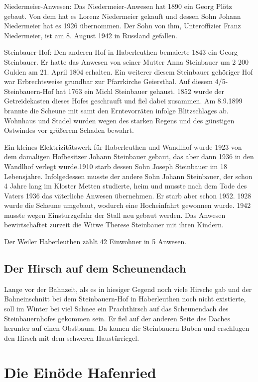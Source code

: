 \documentclass[12pt,a4pager]{book}
\begin{document}
Niedermeier-Anwesen: Das Niedermeier-Anwesen hat 1890 ein Georg Plötz gebaut.
Von dem hat es Lorenz Niedermeier gekauft und dessen Sohn Johann Niedermeier hat
es 1926 übernommen. Der Sohn von ihm, Unteroffizier Franz Niedermeier, ist am 8.
August 1942 in Russland gefallen.

Steinbauer-Hof: Den anderen Hof in Haberleuthen bemaierte 1843 ein Georg
Steinbauer. Er hatte das Anwesen von seiner Mutter Anna Steinbauer um 2 200
Gulden am 21. April 1804 erhalten. Ein weiterer diesem Steinbauer gehöriger Hof
war Erbrechtsweise grundbar zur Pfarrkirche Geiersthal. Auf diesem
4/5-Steinbauern-Hof hat 1763 ein Michl Steinbauer gehaust. 1852 wurde der
Getreidekasten dieses Hofes geschrauft und fiel dabei zusammen. Am 8.9.1899
brannte die Scheune mit samt den Erntevorräten infolge Blitzschlages ab.
Wohnhaus und Stadel wurden wegen des starken Regens und des günstigen Ostwindes
vor größerem Schaden bewahrt.

Ein kleines Elektrizitätswerk für Haberleuthen und Wandlhof wurde 1923 von dem
damaligen Hofbesitzer Johann Steinbauer gebaut, das aber dann 1936 in den
Wandlhof verlegt wurde.1910 starb dessen Sohn Joseph Steinbauer im 18
Lebensjahre. Infolgedessen musste der andere Sohn Johann Steinbauer, der schon 4
Jahre lang im Kloster Metten studierte, heim und musste nach dem Tode des Vaters
1936 das väterliche Anwesen übernehmen. Er starb aber schon 1952. 1928 wurde die
Scheune umgebaut, wodurch eine Hocheinfahrt gewonnen wurde. 1942 musste wegen
Einsturzgefahr der Stall neu gebaut werden. Das Anwesen bewirtschaftet zurzeit
die Witwe Therese Steinbauer mit ihren Kindern.

Der Weiler Haberleuthen zählt 42 Einwohner in 5 Anwesen.

\subsection{Der Hirsch auf dem Scheunendach}

Lange vor der Bahnzeit, als es in hiesiger Gegend noch viele Hirsche gab und der
Bahneinschnitt bei dem Steinbauern-Hof in Haberleuthen noch nicht existierte,
soll im Winter bei viel Schnee ein Prachthirsch auf das Scheunendach des
Steinbauernhofes gekommen sein. Er fiel auf der anderen Seite des Daches
herunter auf einen Obstbaum. Da kamen die Steinbauern-Buben und erschlugen den
Hirsch mit dem schweren Haustürriegel.

\section{Die Einöde Hafenried}
\end{document}
